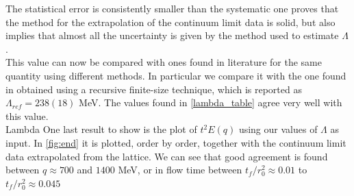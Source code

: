 The statistical error is consistently smaller than the systematic one proves that the method for the extrapolation of the continuum limit data is solid, but also implies that almost all the uncertainty is given by the method used to estimate $\Lambda$. \\
This value can now be compared with ones found in literature for the same quantity using different methods. In particular we compare it with the one found in \cite{capitani_non-perturbative_1999} obtained using a recursive finite-size technique, which is reported as $\Lambda_{ref} = 238(18)$ MeV. The values found in \cref{lambda_table} agree very well with this value.\\Lambda
One last result to show is the plot of $t^2E(q)$ using our values of $\Lambda$ as input. In \cref{fig:end} it is plotted, order by order, together with the continuum limit data extrapolated from the lattice. We can see that good agreement is found between $q \approx 700$ and $1400$ MeV, or in flow time between $t_f/r_0^2 \approx 0.01$ to $t_f/r_0^2 \approx 0.045$

